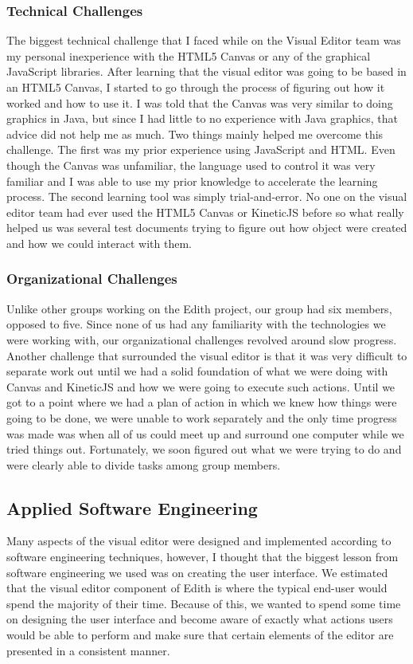 \documentclass[a4paper]{article}
\begin{document}
\subsubsection{Technical Challenges}
The biggest technical challenge that I faced while on the Visual Editor team was my personal inexperience with the HTML5 Canvas or any of the graphical JavaScript libraries. After learning that the visual editor was going to be based in an HTML5 Canvas, I started to go through the process of figuring out how it worked and how to use it. I was told that the Canvas was very similar to doing graphics in Java, but since I had little to no experience with Java graphics, that advice did not help me as much. Two things mainly helped me overcome this challenge. The first was my prior experience using JavaScript and HTML. Even though the Canvas was unfamiliar, the language used to control it was very familiar and I was able to use my prior knowledge to accelerate the learning process. The second learning tool was simply trial-and-error. No one on the visual editor team had ever used the HTML5 Canvas or KineticJS before so what really helped us was several test documents trying to figure out how object were created and how we could interact with them. 
\subsubsection{Organizational Challenges}
Unlike other groups working on the Edith project, our group had six members, opposed to five. Since none of us had any familiarity with the technologies we were working with, our organizational challenges revolved around slow progress. Another challenge that surrounded the visual editor is that it was very difficult to separate work out until we had a solid foundation of what we were doing with Canvas and KineticJS and how we were going to execute such actions. Until we got to a point where we had a plan of action in which we knew how things were going to be done, we were unable to work separately and the only time progress was made was when all of us could meet up and surround one computer while we tried things out. Fortunately, we soon figured out what we were trying to do and were clearly able to divide tasks among group members.
\subsection{Applied Software Engineering}
Many aspects of the visual editor were designed and implemented according to software engineering techniques, however, I thought that the biggest lesson from software engineering we used was on creating the user interface. We estimated that the visual editor component of Edith is where the typical end-user would spend the majority of their time. Because of this, we wanted to spend some time on designing the user interface and become aware of exactly what actions users would be able to perform and make sure that certain elements of the editor are presented in a consistent manner.
\end{document}
